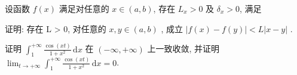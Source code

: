 \par{}
设函数 $f(x)$ 满足对任意的 $x \in (a, b)$, 存在 $L_x > 0$ 及 $\delta_x > 0$, 满足\par
\nopagebreak[4]
证明: 存在 L > 0, 对任意的  $x, y \in (a, b)$ , 成立  $|f(x) - f(y)| < L|x - y|$ .\par
证明 $\int_{1}^{+\infty} \frac{\cos(xt)}{1 + x^2} \, \mathrm{d}x$ 在 $(- \infty, +\infty)$ 上一致收敛, 并证明 $\lim_{t \to +\infty} \int_{1}^{+\infty} \frac{\cos(xt)}{1 + x^2} \, \mathrm{d}x = 0$.\par
